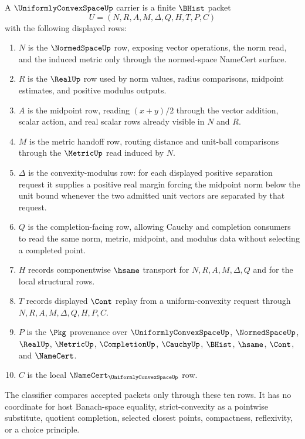 \begin{definition}
\label{def:uniformly-convex-space-carrier}
A $\UniformlyConvexSpaceUp$ carrier is a finite $\BHist$ packet
$$
U=(N,R,A,M,\Delta,Q,H,T,P,C)
$$
with the following displayed rows:
\begin{enumerate}
\item $N$ is the $\NormedSpaceUp$ row, exposing vector operations, the norm read, and the induced metric only through the normed-space NameCert surface.
\item $R$ is the $\RealUp$ row used by norm values, radius comparisons, midpoint estimates, and positive modulus outputs.
\item $A$ is the midpoint row, reading $(x+y)/2$ through the vector addition, scalar action, and real scalar rows already visible in $N$ and $R$.
\item $M$ is the metric handoff row, routing distance and unit-ball comparisons through the $\MetricUp$ read induced by $N$.
\item $\Delta$ is the convexity-modulus row: for each displayed positive separation request it supplies a positive real margin forcing the midpoint norm below the unit bound whenever the two admitted unit vectors are separated by that request.
\item $Q$ is the completion-facing row, allowing Cauchy and completion consumers to read the same norm, metric, midpoint, and modulus data without selecting a completed point.
\item $H$ records componentwise $\hsame$ transport for $N,R,A,M,\Delta,Q$ and for the local structural rows.
\item $T$ records displayed $\Cont$ replay from a uniform-convexity request through $N,R,A,M,\Delta,Q,H,P,C$.
\item $P$ is the $\Pkg$ provenance over $\UniformlyConvexSpaceUp$, $\NormedSpaceUp$, $\RealUp$, $\MetricUp$, $\CompletionUp$, $\CauchyUp$, $\BHist$, $\hsame$, $\Cont$, and $\NameCert$.
\item $C$ is the local $\NameCert_{\UniformlyConvexSpaceUp}$ row.
\end{enumerate}
The classifier compares accepted packets only through these ten rows. It has no coordinate for host Banach-space equality, strict-convexity as a pointwise substitute, quotient completion, selected closest points, compactness, reflexivity, or a choice principle.
\end{definition}

